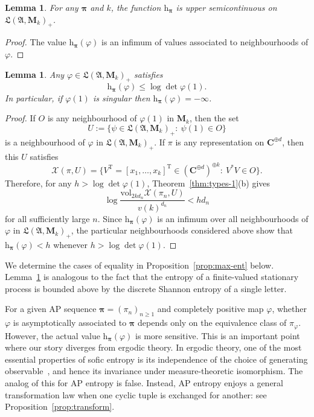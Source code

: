 \documentclass[12pt,a4paper]{article}
\numberwithin{equation}{section}
\newtheorem{lem}[thm]{Lemma}
\theoremstyle{remark}
\renewcommand{\rm}[1]{\mathrm{#1}}
\newcommand{\bbC}{\mathbf{C}}
\newcommand{\rmM}{\mathbf{M}}
\newcommand{\rmh}{\mathrm{h}}
\newcommand{\X}{\mathcal{X}}
\newcommand{\A}{\mathfrak{A}}
\newcommand{\frL}{\mathfrak{L}}
\renewcommand{\phi}{\varphi}
\newcommand{\bspi}{\boldsymbol{\pi}}
\newcommand{\vol}{\mathrm{vol}}
\begin{document}
\begin{lem}\label{lem:upper-semicontinuity}
For any $\bspi$ and $k$, the function $\rmh_{\bspi}$ is upper semicontinuous on $\frL(\A,\rmM_k)_+$.
\end{lem}

\begin{proof}
The value $\rmh_{\bspi}(\phi)$ is an infimum of values associated to neighbourhoods of $\phi$.
\end{proof}

\begin{lem}\label{lem:e-upper-bd}
Any $\phi \in \frL(\A,\rmM_k)_+$ satisfies
	\[\rmh_{\bspi}(\phi) \le \log \det \phi(1).\]
	In particular, if $\phi(1)$ is singular then $\rmh_{\bspi}(\phi) = -\infty$.
	\end{lem}

\begin{proof}
If $O$ is any neighbourhood of $\phi(1)$ in $\rmM_k$, then the set
\[U := \{\psi \in \frL(\A,\rmM_k)_+:\ \psi(1) \in O\}\]
is a neighbourhood of $\phi$ in $\frL(\A,\rmM_k)_+$.  If $\pi$ is any representation on $\bbC^{\oplus d}$, then this $U$ satisfies
\[\X(\pi,U) = \{V^\rm{T} = [x_1,\dots,x_k]^{\rm{T}} \in (\bbC^{\oplus d})^{\oplus k}:\ V^\ast V \in O\}.\]
Therefore, for any $h > \log \det \phi(1)$, Theorem~\ref{thm:types-1}(b) gives
\[\log\frac{\vol_{2kd_n}\X(\pi_n,U)}{v(k)^{d_n}} < hd_n\]
for all sufficiently large $n$.  Since $\rmh_{\bspi}(\phi)$ is an infimum over all neighbourhoods of $\phi$ in $\frL(\A,\rmM_k)_+$, the particular neighbourhoods considered above show that $\rmh_{\bspi}(\phi) < h$ whenever $h > \log \det \phi(1)$.
	\end{proof}

We determine the cases of equality in Proposition~\ref{prop:max-ent} below.  Lemma~\ref{lem:e-upper-bd} is analogous to the fact that the entropy of a finite-valued stationary process is bounded above by the discrete Shannon entropy of a single letter.

For a given AP sequence $\bspi = (\pi_n)_{n\ge 1}$ and completely positive map $\phi$, whether $\phi$ is asymptotically associated to $\bspi$ depends only on the equivalence class of $\pi_\phi$.  However, the actual value $\rmh_{\bspi}(\phi)$ is more sensitive.  This is an important point where our story diverges from ergodic theory.  In ergodic theory, one of the most essential properties of sofic entropy is its independence of the choice of generating observable~\cite{Bowen10}, and hence its invariance under measure-theoretic isomorphism. The analog of this for AP entropy is false. Instead, AP entropy enjoys a general transformation law when one cyclic tuple is exchanged for another: see Proposition~\ref{prop:transform}.
\end{document}
